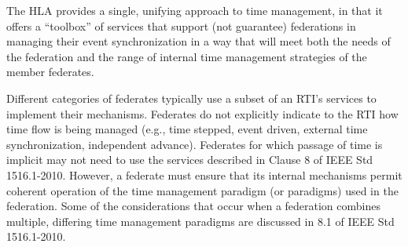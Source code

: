 \vspace{6.1pt}
The HLA provides a single, unifying approach to time management, in that it offers a ``toolbox'' of services\linebreak
that support (not guarantee) federations in managing their event synchronization in a way that will meet both\linebreak
the needs of the federation and the range of internal time management strategies of the member federates.

\vspace{6.1pt}
Different categories of federates typically use a subset of an RTI's services to implement their mechanisms.\linebreak
Federates do not explicitly indicate to the RTI how time flow is being managed (e.g., time stepped, event\linebreak
driven, external time synchronization, independent advance). Federates for which passage of time is implicit\linebreak
may not need to use the services described in Clause 8 of IEEE Std 1516.1-2010. However, a federate must\linebreak
ensure that its internal mechanisms permit coherent operation of the time management paradigm (or\linebreak
paradigms) used in the federation. Some of the considerations that occur when a federation combines\linebreak
multiple, differing time management paradigms are discussed in 8.1 of IEEE Std 1516.1-2010.

\endgroup
